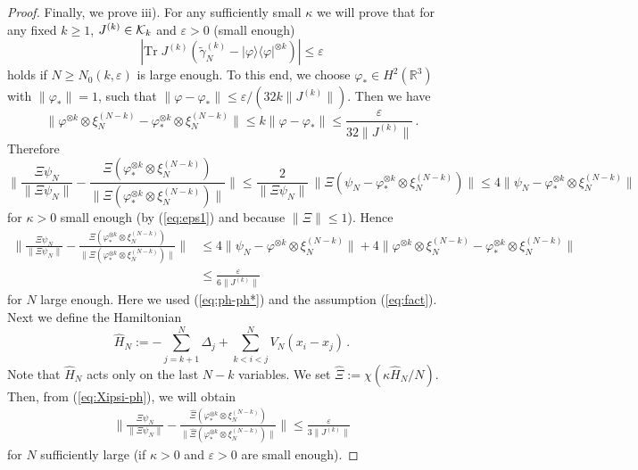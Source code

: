 \documentclass[11pt]{article}
\newcommand{\eps}{\varepsilon}
\newcommand{\ph}{\varphi}
\newcommand{\e}{\varepsilon}
\newcommand{\bR}{{\mathbb R}}
\newcommand{\tr}{\mbox{Tr}}
\newcommand{\wt}{\widetilde}
\newcommand{\wh}{\widehat}
\newcommand{\cK}{{\cal K}}
\begin{document}
\begin{proof}
Finally, we prove iii). For any sufficiently small $\kappa$ we will
prove that for any fixed $k \geq 1$, $J^{(k)} \in \cK_k$ and $\e >0$
(small enough)
\begin{equation}\label{eq:cutoff}
\left|\tr \; J^{(k)} \left( \wt \gamma^{(k)}_N - |\ph\rangle \langle
\ph|^{\otimes k} \right) \right| \leq \e
\end{equation}
holds if $N\ge N_0(k,\e)$ is large enough. To this end, we choose
$\ph_* \in H^2 (\bR^3)$ with $\| \ph_* \| =1$, such that $\| \ph -
\ph_* \| \leq \e/ (32 k \| J^{(k)} \|)$. Then we have
\begin{equation}\label{eq:ph-ph*} \| \ph^{\otimes k} \otimes
\xi_N^{(N-k)} - \ph_*^{\otimes k} \otimes \xi_N^{(N-k)} \| \leq k \|
\ph - \ph_* \| \leq \frac{\e}{32 \| J^{(k)} \|} \,.
\end{equation} Therefore
\begin{equation}
\Big\| \frac{\Xi \psi_N}{\| \Xi \psi_N \|} - \frac{\Xi \left(
\ph_*^{\otimes k} \otimes \xi_N^{(N-k)} \right)}{\|\Xi \left(
\ph_*^{\otimes k} \otimes \xi_N^{(N-k)} \right)\|} \Big\| \leq
\frac{2}{\| \Xi \psi_N \|} \, \Big\| \Xi \left(\psi_N -
\ph_*^{\otimes k} \otimes \xi_N^{(N-k)} \right) \Big\| \leq 4 \big\|
\psi_N - \ph_*^{\otimes k} \otimes \xi_N^{(N-k)} \big\|
\end{equation}
for $\kappa >0$ small enough (by (\ref{eq:eps1}) and because $\|
\Xi\| \leq 1$). Hence
\begin{equation}\label{eq:Xipsi-ph}
\begin{split}
\Big\| \frac{\Xi \psi_N}{\| \Xi \psi_N \|} - \frac{\Xi \left(
\ph_*^{\otimes k} \otimes \xi_N^{(N-k)} \right)}{\|\Xi \left(
\ph_*^{\otimes k} \otimes \xi_N^{(N-k)} \right)\|} \Big\| &\leq 4 \big\|
\psi_N - \ph^{\otimes k} \otimes \xi_N^{(N-k)} \big\| + 4\big\| \ph^{\otimes
k} \otimes \xi_N^{(N-k)} - \ph_*^{\otimes k} \otimes \xi_N^{(N-k)}\big\|
 \\ &\leq \frac{\e}{6 \| J^{(k)}\|}
\end{split}
\end{equation}
for $N$ large enough. Here we used (\ref{eq:ph-ph*}) and the
assumption (\ref{eq:fact}). Next we define the Hamiltonian
\begin{equation}
\wh H_N := -\sum_{j=k+1}^N \Delta_j + \sum_{k<i<j}^N V_N
(x_i-x_j)\,.
\end{equation}
Note that $\wh H_N$ acts only   on the last $N-k$ variables. We set
$\wh\Xi := \chi (\kappa \wh H_N /N)$. Then, from (\ref{eq:Xipsi-ph}),
we will obtain
\begin{equation}\label{eq:hatXipsi-ph}
\begin{split}
\Big\| \frac{\Xi \psi_N}{\| \Xi \psi_N \|} - \frac{\wh\Xi \left(
\ph_*^{\otimes k} \otimes \xi_N^{(N-k)} \right)}{\|\wh\Xi \left(
\ph_*^{\otimes k} \otimes \xi_N^{(N-k)} \right)\|} \Big\| \leq
\frac{\e}{3 \| J^{(k)}\|}
\end{split}
\end{equation}
for $N$ sufficiently large (if $\kappa >0$ and $\eps >0$ are small
enough).


\end{proof}
\end{document}
